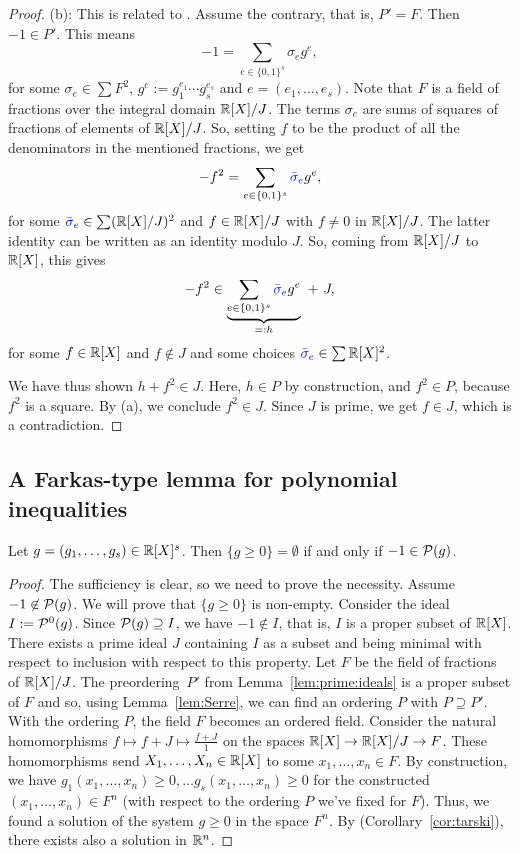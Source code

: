 \begin{proof}
(b): This is related to \cite[Prop.~2.1.6]{Marshall:2008}. Assume the contrary, that is, $P'= F$. Then $-1 \in P'$. This means
\[
	-1 = \sum_{e \in \{0,1\}^s} \sigma_e g^e ,
\]
for some $\sigma_e \in \sum F^2$, $g^e := g_1^{e_1} \cdots g_s^{e_s}$ and $e=(e_1,\ldots,e_s)$. Note that $F$ is a field of fractions over the integral domain $\mathbb{R}[X]/J$. The terms $\sigma_e$ are sums of squares of fractions of elements of $\mathbb{R}[X]/J$. So, setting $f$ to be the product of all the denominators in the mentioned fractions, we get
\[
	-f^2 = \sum_{e \in \{0,1\}^s} \textcolor{blue}{\bar\sigma_e} g^e,
\]
for some $\textcolor{blue}{\bar\sigma_e} \in \sum (\mathbb{R}[X]/J)^2$ and $f \in \mathbb{R}[X]/J$ with $f \ne 0$ in $\mathbb{R}[X]/J$. The latter identity can be written as an identity modulo $J$. So, coming from $\mathbb{R}[X] / J$ to $\mathbb{R}[X]$, this gives
\[
	-f^2 \in \underbrace{\sum_{e \in \{0,1\}^s} \textcolor{blue}{\bar\sigma_e} g^e}_{=:h}\ +\ J,
\]
for some $f \in \mathbb{R}[X]$ and $f \not\in J$ and some choices $\textcolor{blue}{\bar\sigma_e} \in \sum \mathbb{R}[X]^2$. 

We have thus shown $h + f^2 \in J$. Here, $h \in P$ by construction, and $f^2 \in P$, because $f^2$ is a square. By (a), we conclude $f^2 \in J$. Since $J$ is prime, we get $f \in J$, which is a contradiction. 
\end{proof}


\subsection{A Farkas-type lemma for polynomial inequalities}

\begin{theorem} 
	\label{thm:farkas:pop}
	Let $g = (g_1,\ldots,g_s) \in \mathbb{R}[X]^s$. Then $\{g \ge 0\} = \emptyset$ if and only if $-1 \in \mathcal{P}(g)$. 
\end{theorem}
\begin{proof}
	The sufficiency is clear, so we need to prove the necessity. Assume $-1 \not\in \mathcal{P}(g)$. We will prove that $\{g \ge 0\}$ is non-empty. Consider the ideal $I := \mathcal{P}^0(g)$. Since $\mathcal{P}(g) \supseteq I$, we have $-1 \not\in I$, that is, $I$ is a proper subset of $\mathbb{R}[X]$. There exists a prime ideal $J$ containing $I$ as a subset and being minimal with respect to inclusion with respect to this property. Let $F$ be the field of fractions of $\mathbb{R}[X]/J$. The preordering~$P'$ from Lemma~\ref{lem:prime:ideals} is a proper subset of $F$ and so, using Lemma~\ref{lem:Serre}, we can find an ordering $P$ with $P \supseteq P'$. With the ordering $P$, the field $F$ becomes an ordered field. Consider the natural homomorphisms $f \mapsto f+J \mapsto \frac{f+J}{1}$ on the spaces $\mathbb{R}[X] \to \mathbb{R}[X] / J \to F$. These homomorphisms send $X_1,\ldots,X_n \in \mathbb{R}[X]$ to some $x_1,\ldots,x_n \in F$. By construction, we have $g_1(x_1,\ldots,x_n) \ge 0,\ldots g_s(x_1,\ldots,x_n) \ge 0$ for the constructed $(x_1,\ldots,x_n) \in F^n$ (with respect to the ordering $P$ we've fixed for $F$). Thus, we found a solution of the system $g \ge 0$ in the space $F^n$. By  (Corollary~\ref{cor:tarski}), there exists also a solution in $\mathbb{R}^n$. 
\end{proof}

